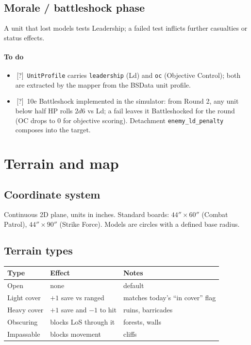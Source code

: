 \documentclass[11pt,a4paper]{article}
\newcommand{\either}{\textcolor{eithergrey}{\textsf{[?]}}}
\newcommand{\done}{\ding{51}\,}     %
\begin{document}
\subsection{Morale / battleshock phase}
A unit that lost models tests Leadership; a failed test inflicts further
casualties or status effects.

\paragraph{To do}
\begin{itemize}[label={},leftmargin=*,itemsep=2pt]
  \item \done \either\ \texttt{UnitProfile} carries
    \texttt{leadership} (Ld) and \texttt{oc} (Objective Control); both
    are extracted by the mapper from the BSData unit profile.
  \item \done \either\ 10e Battleshock implemented in the simulator:
    from Round 2, any unit below half HP rolls $2d6$ vs Ld; a fail
    leaves it Battleshocked for the round (OC drops to 0 for objective
    scoring). Detachment \texttt{enemy\_ld\_penalty} composes into the
    target.
\end{itemize}

\section{Terrain and map}
\label{sec:terrain}

\subsection{Coordinate system}
Continuous 2D plane, units in inches. Standard boards: $44'' \times
60''$ (Combat Patrol), $44'' \times 90''$ (Strike Force). Models are
circles with a defined base radius.

\subsection{Terrain types}
\begin{tabular}{lll}
\toprule
Type & Effect & Notes \\
\midrule
Open        & none                              & default \\
Light cover & $+1$ save vs ranged               & matches today's ``in cover'' flag \\
Heavy cover & $+1$ save and $-1$ to hit         & ruins, barricades \\
Obscuring   & blocks LoS through it             & forests, walls \\
Impassable  & blocks movement                   & cliffs \\
\bottomrule
\end{tabular}
\end{document}
